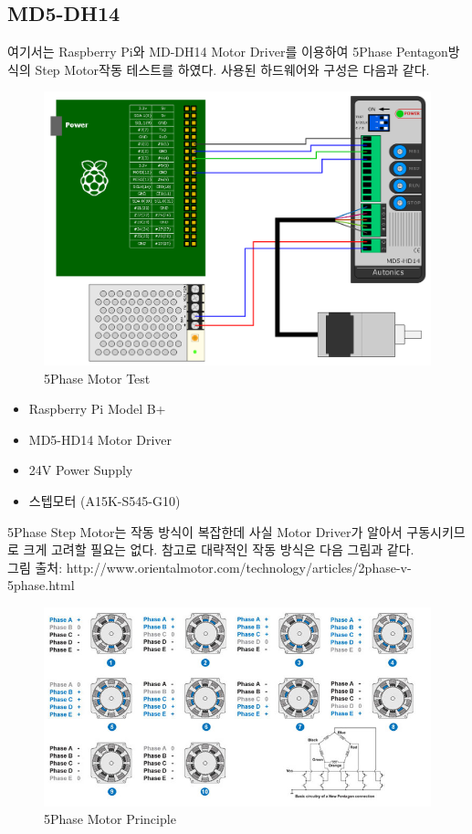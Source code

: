 \documentclass[11pt
  , a4paper
  , article
  , oneside
]{memoir}
\begin{document}
\subsection{MD5-DH14}
 여기서는 Raspberry Pi와 MD-DH14 Motor Driver를 이용하여 5Phase Pentagon방식의 Step Motor작동 테스트를 
하였다. 사용된 하드웨어와 구성은 다음과 같다.
\begin{figure}[!htb]
\centering
\includegraphics[width=1\textwidth]{./images/raspberry/md5dh14Test.png}
\caption{5Phase Motor Test}
\label{fig:5phase_test}
\end{figure}
\begin{itemize}
\item Raspberry Pi Model B+
\item MD5-HD14 Motor Driver
\item 24V Power Supply
\item 스텝모터 (A15K-S545-G10)
\end{itemize}
5Phase Step Motor는 작동 방식이 복잡한데 사실 Motor Driver가 알아서 구동시키므로 크게 고려할 필요는 없다.
참고로 대략적인 작동 방식은 다음 그림과 같다.\\
그림 출처: http://www.orientalmotor.com/technology/articles/2phase-v-5phase.html
\begin{figure}[!htb]
\centering
\includegraphics[width=1\textwidth]{./images/raspberry/5-ph-fullstep.jpg}
\caption{5Phase Motor Principle}
\label{fig:5phase_principle1}
\end{figure}
\end{document}
